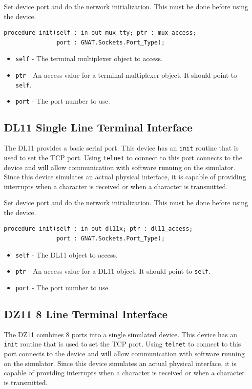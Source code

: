 \documentclass[10pt, openany]{book}
\newcommand{\keyword}[1]{\texttt{#1}}
\begin{document}
Set device port and do the network initialization.
This must be done before using the device.
\begin{lstlisting}
procedure init(self : in out mux_tty; ptr : mux_access;
               port : GNAT.Sockets.Port_Type);
\end{lstlisting}
\begin{itemize}
  \item \keyword{self} - The terminal multiplexer object to access.
  \item \keyword{ptr} - An access value for a terminal multiplexer object.  It should point to \keyword{self}.
  \item \keyword{port} - The port number to use.
\end{itemize}

\subsection{DL11 Single Line Terminal Interface}
The DL11 provides a basic serial port.
This device has an \verb|init| routine that is used to set the TCP port.
Using \verb|telnet| to connect to this port connects to the device and will allow communication with software running on the simulator.
Since this device simulates an actual physical interface, it is capable of providing interrupts when a character is received or when a character is transmitted.

Set device port and do the network initialization.
This must be done before using the device.
\begin{lstlisting}
procedure init(self : in out dl11x; ptr : dl11_access;
               port : GNAT.Sockets.Port_Type);
\end{lstlisting}
\begin{itemize}
  \item \keyword{self} - The DL11 object to access.
  \item \keyword{ptr} - An access value for a DL11 object.  It should point to \keyword{self}.
  \item \keyword{port} - The port number to use.
\end{itemize}

\subsection{DZ11 8 Line Terminal Interface}
The DZ11 combines 8 ports into a single simulated device.
This device has an \verb|init| routine that is used to set the TCP port.
Using \verb|telnet| to connect to this port connects to the device and will allow communication with software running on the simulator.
Since this device simulates an actual physical interface, it is capable of providing interrupts when a character is received or when a character is transmitted.
\end{document}
